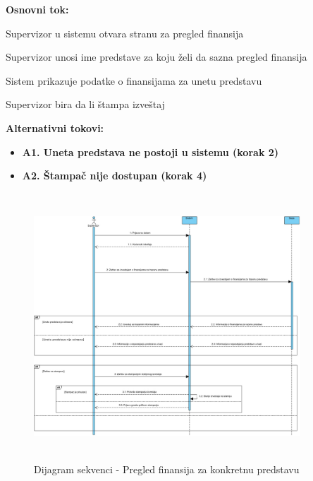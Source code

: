 \documentclass[a4paper]{article}
\begin{document}
\noindent\textbf{Osnovni tok:} 
\begin{legal}
  \item Supervizor u sistemu otvara stranu za pregled finansija
  \item Supervizor unosi ime predstave za koju želi da sazna pregled finansija
  \item Sistem prikazuje podatke o finansijama za unetu predstavu
  \item Supervizor bira da li štampa izveštaj
\end{legal}

\noindent\textbf{Alternativni tokovi:}
\begin{itemize}
  \item \textbf{A1. Uneta predstava ne postoji u sistemu (korak 2)} 

  \item \textbf{A2. Štampač nije dostupan (korak 4)} 

\end{itemize}

\begin{figure}[H]
  \begin{center}
    \includegraphics[width=100mm,height=100mm]{../images/sequence_vodjenje_finansija_2.jpg}
  \end{center}
  \caption{Dijagram sekvenci - Pregled finansija za konkretnu predstavu}
  \label{sekvence_vodjenje_finansija_predstava}
\end{figure}
\end{document}
